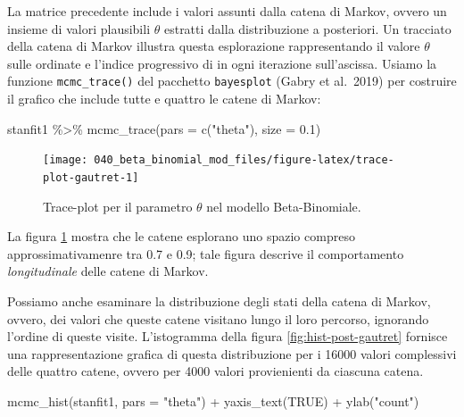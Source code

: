 \documentclass[
  10pt,
  italian,
  a4paper,
  extrafontsizes,onecolumn,openright
  ]{memoir}
\newenvironment{Shaded}{}{}
\newcommand{\AttributeTok}[1]{\textcolor[rgb]{0.49,0.56,0.16}{#1}}
\newcommand{\ConstantTok}[1]{\textcolor[rgb]{0.53,0.00,0.00}{#1}}
\newcommand{\FloatTok}[1]{\textcolor[rgb]{0.25,0.63,0.44}{#1}}
\newcommand{\FunctionTok}[1]{\textcolor[rgb]{0.02,0.16,0.49}{#1}}
\newcommand{\NormalTok}[1]{#1}
\newcommand{\SpecialCharTok}[1]{\textcolor[rgb]{0.25,0.44,0.63}{#1}}
\newcommand{\StringTok}[1]{\textcolor[rgb]{0.25,0.44,0.63}{#1}}
\begin{document}
\noindent
La matrice precedente include i valori assunti dalla catena di Markov, ovvero un insieme di valori plausibili \(\theta\) estratti dalla distribuzione a posteriori.
Un tracciato della catena di Markov illustra questa esplorazione rappresentando il valore \(\theta\) sulle ordinate e l'indice progressivo di in ogni iterazione sull'ascissa. Usiamo la funzione \texttt{mcmc\_trace()} del pacchetto \texttt{bayesplot} (Gabry et al.~2019) per costruire il grafico che include tutte e quattro le catene di Markov:

\begin{Shaded}
\begin{Highlighting}[]
\NormalTok{stanfit1 }\SpecialCharTok{\%\textgreater{}\%} 
  \FunctionTok{mcmc\_trace}\NormalTok{(}\AttributeTok{pars =} \FunctionTok{c}\NormalTok{(}\StringTok{"theta"}\NormalTok{), }\AttributeTok{size =} \FloatTok{0.1}\NormalTok{)}
\end{Highlighting}
\end{Shaded}

\begin{figure}[h]

{\centering \texttt{[image: 040\_beta\_binomial\_mod\_files/figure-latex/trace-plot-gautret-1]} 

}

\caption{Trace-plot per il parametro $\theta$ nel modello Beta-Binomiale.}\label{fig:trace-plot-gautret}
\end{figure}

\noindent
La figura \ref{fig:trace-plot-gautret} mostra che le catene esplorano uno spazio compreso approssimativamenre tra 0.7 e 0.9; tale figura descrive il comportamento \emph{longitudinale} delle catene di Markov.

Possiamo anche esaminare la distribuzione degli stati della catena di Markov, ovvero, dei valori che queste catene visitano lungo il loro percorso, ignorando l'ordine di queste visite. L'istogramma della figura \ref{fig:hist-post-gautret} fornisce una rappresentazione grafica di questa distribuzione per i 16000 valori complessivi delle quattro catene, ovvero per 4000 valori provienienti da ciascuna catena.

\begin{Shaded}
\begin{Highlighting}[]
\FunctionTok{mcmc\_hist}\NormalTok{(stanfit1, }\AttributeTok{pars =} \StringTok{"theta"}\NormalTok{) }\SpecialCharTok{+} 
  \FunctionTok{yaxis\_text}\NormalTok{(}\ConstantTok{TRUE}\NormalTok{) }\SpecialCharTok{+} 
  \FunctionTok{ylab}\NormalTok{(}\StringTok{"count"}\NormalTok{)}
\end{Highlighting}
\end{Shaded}
\end{document}
